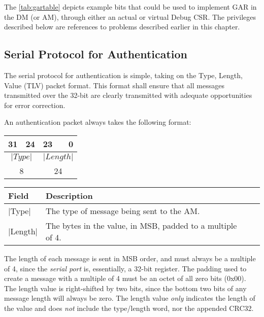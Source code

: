 The \ref{tab:gartable} depicts example bits that could be used to implement GAR in the DM (or AM), through either an actual or virtual Debug CSR. The privileges described below are references to problems described earlier in this chapter.

\subsection{Serial Protocol for Authentication}
The serial protocol for authentication is simple, taking on the Type, Length, Value (TLV) packet format. This format shall ensure that all messages transmitted over the 32-bit  are clearly transmitted with adequate opportunities for error correction. 

An authentication packet always takes the following format:
\begin{center}
	\begin{tabular}{p{4.0 ex}p{4.0 ex}p{8.0 ex}p{16.0 ex}}
		{\scriptsize 31} & \multicolumn{1}{r}{\scriptsize 24}
		&
		{\scriptsize 23} & \multicolumn{1}{r}{\scriptsize 0} \\
		\hline
		\multicolumn{2}{|c|}{$|Type|$} & \multicolumn{2}{c|}{$|Length|$} \\
		\hline
		\multicolumn{2}{c}{\scriptsize 8} & \multicolumn{2}{c}{\scriptsize 24} \\
	\end{tabular}
\end{center}

\begin{center}
	\begin{xtabular}{|l|p{0.5\textwidth}|c|l|}
	\hline
    Field & Description \\
	\hline
	|Type| & The type of message being sent to the AM.\\
    |Length| & The bytes in the value, in MSB, padded to a multiple of 4.\\
	\hline
	\end{xtabular}
\end{center}

The length of each message is sent in MSB order, and must always be a multiple of 4, since the {\em serial port} is, essentially, a 32-bit register. The padding used to create a message with a multiple of 4 must be an octet of all zero bits (0x00). The length value is right-shifted by two bits, since the bottom two bits of any message length will always be zero. The length value {\em only} indicates the length of the value and does {\em not} include the type/length word, nor the appended CRC32.

